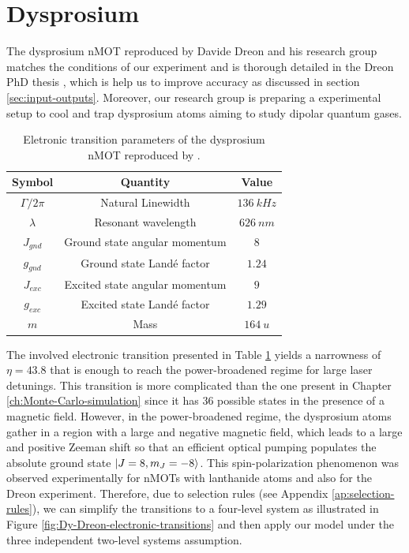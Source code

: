 %
\section{Dysprosium}
\label{sec:dysprosium}
%

The dysprosium nMOT \cite{dreon2017optical} reproduced by Davide Dreon and his research group matches the conditions of our experiment and is thorough detailed in the Dreon PhD thesis \cite{dreon2017designing}, which is help us to improve accuracy as discussed in section \ref{sec:input-outputs}. Moreover, our research group is preparing a experimental setup to cool and trap dysprosium atoms aiming to study dipolar quantum gases.

\begin{table}[ht!]
    \centering
    \begin{tabular}{|c|c|c|}
        \hline
        \textbf{Symbol} & \textbf{Quantity} & \textbf{Value} \\ \hline
        $ \Gamma / 2\pi $ & Natural Linewidth & $ 136\ kHz $ \\
        $ \lambda $ & Resonant wavelength & $ 626\ nm $ \\
        $ J_{gnd} $ & Ground state angular momentum & $ 8 $ \\
        $ g_{gnd} $ & Ground state Landé factor & $ 1.24 $ \\
        $ J_{exc} $ & Excited state angular momentum & $ 9 $ \\
        $ g_{exc} $ & Excited state Landé factor & $ 1.29 $ \\
        $ m $ & Mass & $ 164\ u $ \\
        \hline
    \end{tabular}
    \caption{Eletronic transition parameters of the dysprosium nMOT reproduced by \cite{dreon2017designing}.}
    \label{tab:electronic-transition-Dy-Dreon}
\end{table}

The involved electronic transition presented in Table \ref{tab:electronic-transition-Dy-Dreon} yields a narrowness of $ \eta =  43.8 $ that is enough to reach the power-broadened regime for large laser detunings. This transition is more complicated than the one present in Chapter \ref{ch:Monte-Carlo-simulation} since it has 36 possible states in the presence of a magnetic field. However, in the power-broadened regime, the dysprosium atoms gather in a region with a large and negative magnetic field, which leads to a large and positive Zeeman shift so that an efficient optical pumping populates the absolute ground state $ \ket{J = 8, m_J = -8} $. This spin-polarization phenomenon was observed experimentally for nMOTs with lanthanide atoms \cite{lu2011strongly,aikawa2012bose} and also for the Dreon experiment. Therefore, due to selection rules (see Appendix \ref{ap:selection-rules}), we can simplify the transitions to a four-level system as illustrated in Figure \ref{fig:Dy-Dreon-electronic-transitions} and then apply our model under the three independent two-level systems assumption.

